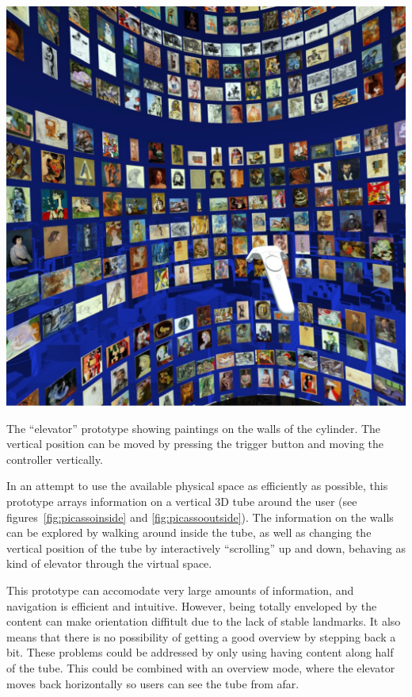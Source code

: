 \documentclass[nobib]{tufte-book} %
\begin{document}
\begin{marginfigure}
  \includegraphics[width=\linewidth]{picassoinside.jpg}
  \caption{The ``elevator'' prototype showing paintings on the walls of the cylinder. The vertical position can be moved by pressing the trigger button and moving the controller vertically.}
  \label{fig:picassoinside}
\end{marginfigure}

In an attempt to use the available physical space as efficiently as possible, this prototype arrays information on a vertical 3D tube around the user (see figures~\ref{fig:picassoinside} and \ref{fig:picassooutside}). The information on the walls can be explored by walking around inside the tube, as well as changing the vertical position of the tube by interactively ``scrolling'' up and down, behaving as kind of elevator through the virtual space.

This prototype can accomodate very large amounts of information, and navigation is efficient and intuitive. However, being totally enveloped by the content can make orientation diffitult due to the lack of stable landmarks. It also means that there is no possibility of getting a good overview by stepping back a bit. These problems could be addressed by only using having content along half of the tube. This could be combined with an overview mode, where the elevator moves back horizontally so users can see the tube from afar.
\end{document}
